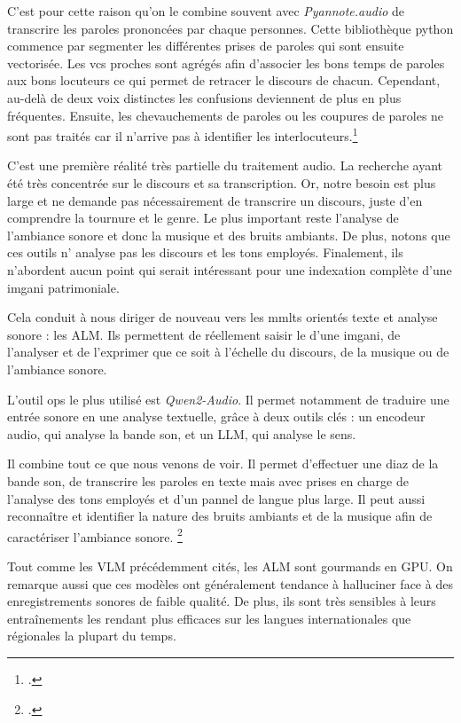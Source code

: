 C'est pour cette raison qu'on le combine souvent avec \textit{Pyannote.audio} de transcrire les paroles prononcées par chaque personnes. Cette bibliothèque python commence par segmenter les différentes prises de paroles qui sont ensuite vectorisée. Les \gls{vcs} proches sont agrégés afin d'associer les bons temps de paroles aux bons locuteurs ce qui permet de retracer le discours de chacun. Cependant, au-delà de deux voix distinctes les confusions deviennent de plus en plus fréquentes. Ensuite, les chevauchements de paroles ou les coupures de paroles ne sont pas traités car il n'arrive pas à identifier les interlocuteurs.\footcite{bredinPyannoteaudio21Speaker2023}\newline

C'est une première réalité très partielle du traitement audio. La recherche ayant été très concentrée sur le discours et sa transcription. Or, notre besoin est plus large et ne demande pas nécessairement de transcrire un discours, juste d'en comprendre la tournure et le genre. Le plus important reste l'analyse de l'ambiance sonore et donc la musique et des bruits ambiants. De plus, notons que ces outils n' analyse pas les discours et les tons employés. Finalement, ils n'abordent aucun point qui serait intéressant pour une indexation complète d'une \gls{imgani} patrimoniale.\newline

Cela conduit à nous diriger de nouveau vers les \gls{mmlts} orientés texte et analyse sonore : les \gls{ALM}. Ils permettent de réellement saisir le  d'une \gls{imgani}, de l'analyser et de l'exprimer que ce soit à l'échelle du discours, de la musique ou de l'ambiance sonore. 

\label{QWEN2} L'outil \gls{ops} le plus utilisé est \textit{Qwen2-Audio}. Il permet notamment de traduire une entrée sonore en une analyse textuelle, grâce à deux outils clés : un encodeur audio, qui analyse la bande son, et un \gls{LLM}, qui analyse le sens. 

Il combine tout ce que nous venons de voir. Il permet d'effectuer une \gls{diaz} de la bande son, de transcrire les paroles en texte mais avec prises en charge de l'analyse des tons employés et d'un pannel de langue plus large. Il peut aussi reconnaître et identifier la nature des bruits ambiants et de la musique afin de caractériser l'ambiance sonore. \footcite{chuQwenAudioAdvancingUniversal2023}\newline

Tout comme les \gls{VLM} précédemment cités, les \gls{ALM} sont gourmands en \gls{GPU}. On remarque aussi que ces modèles ont généralement tendance à halluciner face à des enregistrements sonores de faible qualité. De plus, ils sont très sensibles à leurs entraînements les rendant plus efficaces sur les langues internationales que régionales la plupart du temps.

